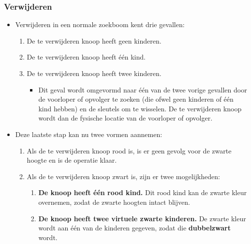 \subsubsection{Verwijderen}
\begin{itemize}
    \item Verwijderen in een normale zoekboom kent drie gevallen:
    \begin{enumerate}
        \item De te verwijderen knoop heeft geen kinderen.
        \item De te verwijderen knoop heeft één kind.
        \item De te verwijderen knoop heeft twee kinderen. 
        \begin{itemize}
            \item Dit geval wordt omgevormd naar één van de twee vorige gevallen door de voorloper of opvolger te zoeken (die ofwel geen kinderen of één kind hebben) en de sleutels om te wisselen. De te verwijderen knoop wordt dan de fysische locatie van de voorloper of opvolger. 
        \end{itemize}
    \end{enumerate}

    \item Deze laatste stap kan nu twee vormen aannemen:
    \begin{enumerate}
        \item Als de te verwijderen knoop rood is, is er geen gevolg voor de zwarte hoogte en is de operatie klaar.
        \item Als de te verwijderen knoop zwart is, zijn er twee mogelijkheden:
        \begin{enumerate}
            \item \textbf{De knoop heeft één rood kind.} Dit rood kind kan de zwarte kleur overnemen, zodat de zwarte hoogten intact blijven.
            \item \textbf{De knoop heeft twee virtuele zwarte kinderen.} De zwarte kleur wordt aan één van de kinderen gegeven, zodat die \textbf{dubbelzwart} wordt.
        \end{enumerate}
    \end{enumerate}


\end{itemize}
